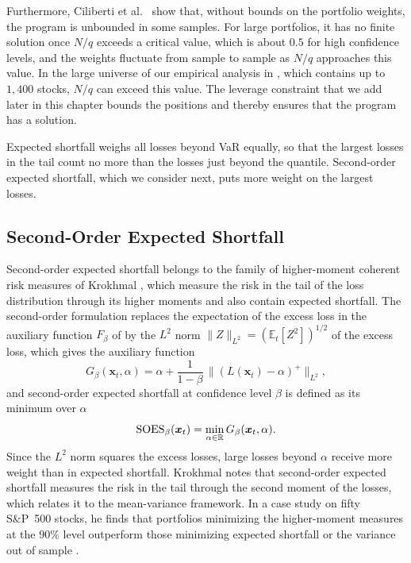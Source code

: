 Furthermore, Ciliberti et
al.~\cite{ciliberti2007feasibility} show that, without bounds on the portfolio weights, the program is unbounded in some samples. 
For large portfolios, it
has no finite solution once $N/q$ exceeds a critical value, which is about $0.5$ for high confidence levels, and the weights fluctuate from sample to sample as $N/q$ approaches this value. In the large
universe of our empirical analysis in , which contains up to $1{,}400$ stocks, $N/q$ can exceed this value. The leverage
constraint that we add later in this chapter bounds the positions and thereby ensures that the program has a solution.

Expected shortfall weighs all losses beyond VaR equally, so that the largest losses in the tail count no more
than the losses just beyond the quantile. Second-order expected shortfall, which we consider next, puts more weight on
the largest losses.

\subsection{Second-Order Expected Shortfall}\label{sec:risk-soes}

Second-order expected shortfall belongs to the family of higher-moment coherent risk measures of Krokhmal
\cite{Krokhmal2007}, which measure the risk in the tail of the loss distribution through its higher moments and also contain
expected shortfall. The second-order formulation replaces the expectation of the excess loss in the auxiliary
function $F_\beta$ of  by the $L^2$ norm $\|Z\|_{L^2} = (\mathbb{E}_t[Z^2])^{1/2}$ of the excess loss, which gives the
auxiliary function
\begin{equation*}
    G_\beta(\bm{x}_t, \alpha) = \alpha + \frac{1}{1-\beta}\, \bigl\| (L(\bm{x}_t) - \alpha)^+ \bigr\|_{L^2},
\end{equation*}
and second-order expected shortfall at confidence level $\beta$ is defined as its minimum over $\alpha$
\begin{equation*}
    \text{SOES}_\beta(\bm{x}_t) = \min_{\alpha \in \mathbb{R}} G_\beta(\bm{x}_t, \alpha).
\end{equation*}
Since the $L^2$ norm squares the excess losses, large losses beyond $\alpha$ receive more weight than in expected
shortfall. Krokhmal notes that second-order expected shortfall measures the risk in the tail through the second moment
of the losses, which relates it to the mean-variance framework. In a case study on fifty S\&P~500 stocks, he finds that 
portfolios minimizing the higher-moment measures at the $90\%$ level outperform
those minimizing expected shortfall or the variance out of sample \cite{Krokhmal2007}.

